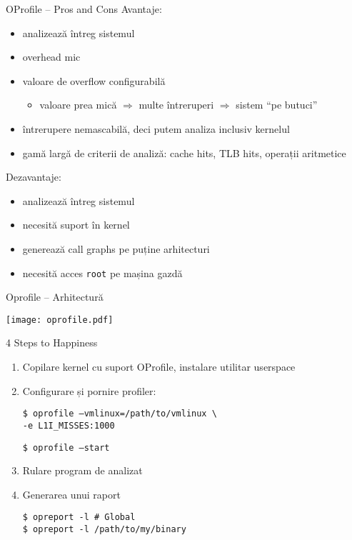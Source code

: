 \documentclass{beamer}
\begin{document}
\begin{frame}{OProfile -- Pros and Cons}
  Avantaje:
  \begin{itemize}
    \item analizează întreg sistemul
    \item overhead mic
    \item valoare de overflow configurabilă
    \pause
    \begin{itemize}
      \item valoare prea mică $\Rightarrow$ multe întreruperi $\Rightarrow$
      sistem ``pe butuci''
    \end{itemize}
    \pause
    \item întrerupere nemascabilă, deci putem analiza inclusiv kernelul
    \item gamă largă de criterii de analiză: cache hits, TLB hits, operații
    aritmetice
  \end{itemize}

  \pause
  Dezavantaje:
  \begin{itemize}
    \item analizează întreg sistemul
    \item necesită suport în kernel
    \item generează call graphs pe puține arhitecturi
    \item necesită acces \texttt{root} pe mașina gazdă
  \end{itemize}
\end{frame}

\begin{frame}{Oprofile -- Arhitectură}
  \begin{center}
    \texttt{[image: oprofile.pdf]}
  \end{center}
\end{frame}

\begin{frame}{4 Steps to Happiness}
  \begin{enumerate}
  \item Copilare kernel cu suport OProfile, instalare utilitar userspace
  \item Configurare și pornire profiler:

    \begin{beamerboxesrounded}[lower=block body,shadow=true]{}
      \texttt{\$ oprofile --vmlinux=/path/to/vmlinux \textbackslash} \\
      \qquad \qquad \texttt{-e L1I\_MISSES:1000}\\
    \end{beamerboxesrounded}
    \texttt{\$ oprofile --start}
  \item Rulare program de analizat
  \item Generarea unui raport

    \begin{beamerboxesrounded}[lower=block body,shadow=true]{}
      \texttt{\$ opreport -l \# Global} \\
      \texttt{\$ opreport -l /path/to/my/binary}
    \end{beamerboxesrounded}
  \end{enumerate}
\end{frame}
\end{document}
